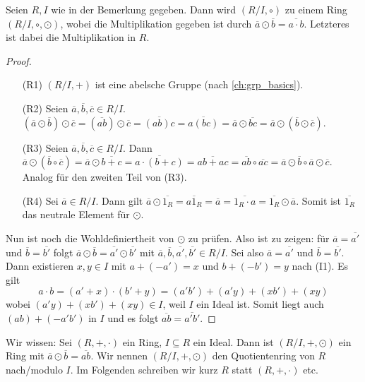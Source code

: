 \documentclass[12pt,a4paper]{scrartcl}
\begin{document}
\begin{satz}
	Seien $R, I$ wie in der Bemerkung gegeben. Dann wird $(R/I, \circ)$ zu einem Ring $(R/I,\circ,\odot)$, wobei die Multiplikation gegeben ist durch $\overline{a}\odot \overline{b} = \overline{a\cdot b}$. Letzteres ist dabei die Multiplikation in $R$.
\end{satz}
\begin{proof}
	\leavevmode
	\begin{itemize}
		\item[(R1)] $(R/I,+)$ ist eine abelsche Gruppe (nach \cref{ch:grp_basics}).
		\item[(R2)] Seien $\overline{a},\overline{b},\overline{c}\in R/I$. $(\overline{a}\odot\overline{b})\odot\overline{c}  = (\overline{ab})\odot \overline{c} = \overline{(ab)c} = \overline{a(bc)}  = \overline{a}\odot \overline{bc} = \overline{a}\odot(\overline{b}\odot\overline{c})$. 
		\item[(R3)] Seien $\overline{a},\overline{b},\overline{c}\in R/I$. Dann $\overline{a}\odot(\overline{b}\circ \overline{c}) = \overline{a}\odot\overline{b+c} = \overline{a\cdot(b+c)} =\overline{ab+ac} = \overline{ab}\circ\overline{ac} = \overline{a}\odot \overline{b}\circ\overline{a}\odot\overline{c}$. Analog für den zweiten Teil von (R3).
		\item[(R4)] Sei $\overline{a}\in R/I$. Dann gilt $\overline{a}\odot\overline{1_R}  = \overline{a1_R} = \overline{a} = \overline{1_R\cdot a} = \overline{1_R}\odot \overline{a}$. Somit ist $\overline{1_R}$ das neutrale Element für $\odot$.
		
	\end{itemize}
	
	Nun ist noch die Wohldefiniertheit von $\odot$ zu prüfen. Also ist zu zeigen: für $\overline{a} = \overline{a'}$ und $\overline{b} = \overline{b'}$ folgt $\overline{a}\odot\overline{b} = \overline{a'}\odot\overline{b'}$ mit $\overline{a},\overline{b},\overline{a'},\overline{b'}\in R/I$. Sei also $\overline{a} = \overline{a'}$ und $\overline{b} = \overline{b'}$. 
	Dann existieren $x,y\in I$ mit $a+(-a') = x$ und $b+(-b') = y$ nach (I1).
	Es gilt $$a\cdot b = (a'+x)\cdot (b'+y)  = (a'b')+(a'y)+(xb')+(xy)$$ wobei $(a'y)+(xb')+(xy)\in I$, weil $I$ ein Ideal ist. Somit liegt auch $(ab)+(-a'b')$ in $I$ und es folgt $\overline{ab} = \overline{a'b'}$.
\end{proof}




\noindent Wir wissen: Sei $(R,+,\cdot)$ ein Ring, $I\subseteq R$ ein Ideal. Dann ist $(R/I,+,\odot)$ ein Ring mit $\overline{a}\odot\overline{b} = \overline{ab}$. Wir nennen $(R/I,+,\odot)$ den Quotientenring von $R$ nach/modulo $I$. Im Folgenden schreiben wir kurz $R$ statt $(R,+,\cdot)$ etc.
\end{document}

